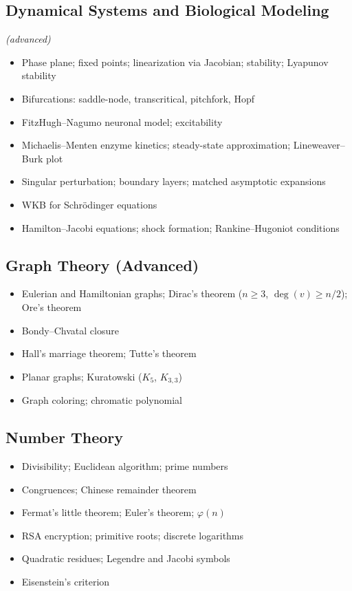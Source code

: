 \subsection{Dynamical Systems and Biological Modeling} \textit{(advanced)}

\begin{itemize}
  \item Phase plane; fixed points; linearization via Jacobian; stability; Lyapunov stability
  \item Bifurcations: saddle-node, transcritical, pitchfork, Hopf
  \item FitzHugh--Nagumo neuronal model; excitability
  \item Michaelis--Menten enzyme kinetics; steady-state approximation; Lineweaver--Burk plot
  \item Singular perturbation; boundary layers; matched asymptotic expansions
  \item WKB for Schr\"odinger equations
  \item Hamilton--Jacobi equations; shock formation; Rankine--Hugoniot conditions
\end{itemize}

\subsection{Graph Theory (Advanced)}

\begin{itemize}
  \item Eulerian and Hamiltonian graphs; Dirac's theorem ($n\geq3$, $\deg(v)\geq n/2$); Ore's theorem
  \item Bondy--Chvatal closure
  \item Hall's marriage theorem; Tutte's theorem
  \item Planar graphs; Kuratowski ($K_5$, $K_{3,3}$)
  \item Graph coloring; chromatic polynomial
\end{itemize}

\subsection{Number Theory}

\begin{itemize}
  \item Divisibility; Euclidean algorithm; prime numbers
  \item Congruences; Chinese remainder theorem
  \item Fermat's little theorem; Euler's theorem; $\varphi(n)$
  \item RSA encryption; primitive roots; discrete logarithms
  \item Quadratic residues; Legendre and Jacobi symbols
  \item Eisenstein's criterion
\end{itemize}

